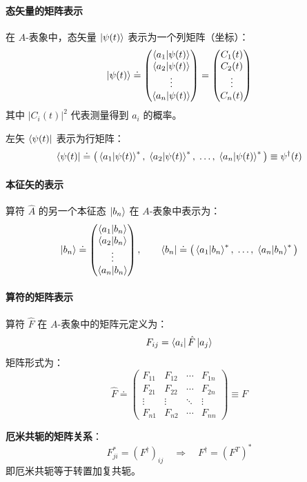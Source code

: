 \documentclass[12pt,a4paper]{article}
\begin{document}
\paragraph{态矢量的矩阵表示}
在 $A$-表象中，态矢量 $\ket{\psi(t)}$ 表示为一个列矩阵（坐标）：
\[
\ket{\psi(t)}\doteq
\begin{pmatrix}
\braket{a_1|\psi(t)}\\
\braket{a_2|\psi(t)}\\
\vdots\\
\braket{a_n|\psi(t)}
\end{pmatrix}
=
\begin{pmatrix}
C_1(t)\\
C_2(t)\\
\vdots\\
C_n(t)
\end{pmatrix}
\]
其中 $|C_i(t)|^2$ 代表测量得到 $a_i$ 的概率。

左矢 $\bra{\psi(t)}$ 表示为行矩阵：
\[
\bra{\psi(t)}\doteq\big(\braket{a_1|\psi(t)}^*,\;\braket{a_2|\psi(t)}^*,\;\ldots,\;\braket{a_n|\psi(t)}^*\big)\equiv\psi^\dagger(t)
\]

\paragraph{本征矢的表示}
算符 $\hat{A}$ 的另一个本征态 $\ket{b_n}$ 在 $A$-表象中表示为：
\[
\ket{b_n}\doteq
\begin{pmatrix}
\braket{a_1|b_n}\\
\braket{a_2|b_n}\\
\vdots\\
\braket{a_n|b_n}
\end{pmatrix},\qquad
\bra{b_n}\doteq\big(\braket{a_1|b_n}^*,\;\ldots,\;\braket{a_n|b_n}^*\big)
\]

\paragraph{算符的矩阵表示}
算符 $\hat{F}$ 在 $A$-表象中的矩阵元定义为：
\[
F_{ij}=\bra{a_i}\hat{F}\ket{a_j}
\]
矩阵形式为：
\[
\hat{F}\doteq
\begin{pmatrix}
F_{11} & F_{12} & \cdots & F_{1n}\\
F_{21} & F_{22} & \cdots & F_{2n}\\
\vdots & \vdots & \ddots & \vdots\\
F_{n1} & F_{n2} & \cdots & F_{nn}
\end{pmatrix}
\equiv F
\]

\textbf{厄米共轭的矩阵关系}：
\[
F_{ji}^*=(F^\dagger)_{ij}\quad\Rightarrow\quad F^\dagger=(F^T)^*
\]
即厄米共轭等于转置加复共轭。
\end{document}

